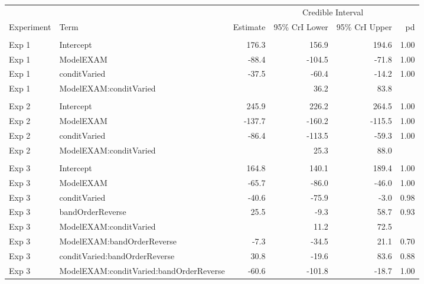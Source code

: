 \documentclass[
  11pt,
  letterpaper,
]{article}
\begin{document}
\begin{longtable}{llrrrr}
\toprule
 &  &  & \multicolumn{2}{c}{Credible Interval} &  \\ 
\cmidrule(lr){4-5}
Experiment & Term & Estimate & 95\% CrI Lower & 95\% CrI Upper & pd \\ 
\midrule\addlinespace[2.5pt]
\multicolumn{6}{l}{Experiment 1} \\[2.5pt] 
\midrule\addlinespace[2.5pt]
Exp 1 & Intercept & 176.3 & 156.9 & 194.6 & 1.00 \\ 
Exp 1 & ModelEXAM & -88.4 & -104.5 & -71.8 & 1.00 \\ 
Exp 1 & conditVaried & -37.5 & -60.4 & -14.2 & 1.00 \\ 
Exp 1 & ModelEXAM:conditVaried & {\bfseries \cellcolor[HTML]{FFFFFF}{60.4}} & 36.2 & 83.8 & {\bfseries \cellcolor[HTML]{FFFFFF}{1.00}} \\ 
\midrule\addlinespace[2.5pt]
\multicolumn{6}{l}{Experiment 2} \\[2.5pt] 
\midrule\addlinespace[2.5pt]
Exp 2 & Intercept & 245.9 & 226.2 & 264.5 & 1.00 \\ 
Exp 2 & ModelEXAM & -137.7 & -160.2 & -115.5 & 1.00 \\ 
Exp 2 & conditVaried & -86.4 & -113.5 & -59.3 & 1.00 \\ 
Exp 2 & ModelEXAM:conditVaried & {\bfseries \cellcolor[HTML]{FFFFFF}{56.9}} & 25.3 & 88.0 & {\bfseries \cellcolor[HTML]{FFFFFF}{1.00}} \\ 
\midrule\addlinespace[2.5pt]
\multicolumn{6}{l}{Experiment 3} \\[2.5pt] 
\midrule\addlinespace[2.5pt]
Exp 3 & Intercept & 164.8 & 140.1 & 189.4 & 1.00 \\ 
Exp 3 & ModelEXAM & -65.7 & -86.0 & -46.0 & 1.00 \\ 
Exp 3 & conditVaried & -40.6 & -75.9 & -3.0 & 0.98 \\ 
Exp 3 & bandOrderReverse & 25.5 & -9.3 & 58.7 & 0.93 \\ 
Exp 3 & ModelEXAM:conditVaried & {\bfseries \cellcolor[HTML]{FFFFFF}{41.9}} & 11.2 & 72.5 & {\bfseries \cellcolor[HTML]{FFFFFF}{0.99}} \\ 
Exp 3 & ModelEXAM:bandOrderReverse & -7.3 & -34.5 & 21.1 & 0.70 \\ 
Exp 3 & conditVaried:bandOrderReverse & 30.8 & -19.6 & 83.6 & 0.88 \\ 
Exp 3 & ModelEXAM:conditVaried:bandOrderReverse & -60.6 & -101.8 & -18.7 & 1.00 \\ 
\bottomrule

\end{longtable}
\end{document}
